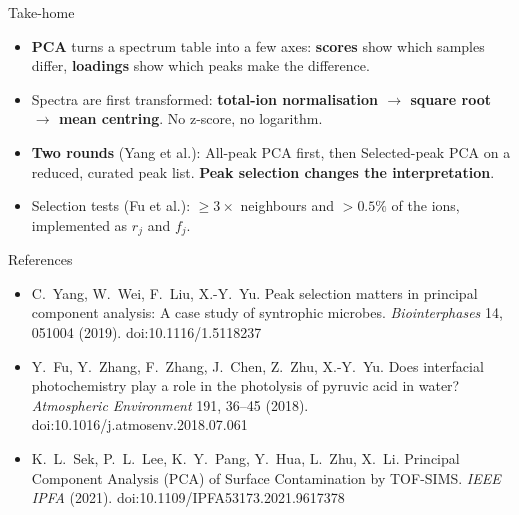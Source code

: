 \documentclass[aspectratio=169,10pt]{beamer}
\newcommand{\hl}[1]{{\color{warm}\bfseries #1}}
\begin{document}
\begin{frame}{Take-home}
  \begin{itemize}\setlength\itemsep{3mm}
    \item \hl{PCA} turns a spectrum table into a few axes: \hl{scores} show which samples differ, \hl{loadings} show which peaks make the difference.
    \item Spectra are first transformed: \hl{total-ion normalisation $\rightarrow$ square root $\rightarrow$ mean centring}. No z-score, no logarithm.
    \item \hl{Two rounds} (Yang et al.): All-peak PCA first, then Selected-peak PCA on a reduced, curated peak list. \hl{Peak selection changes the interpretation}.
    \item Selection tests (Fu et al.): $\ge3\times$ neighbours and $>0.5\%$ of the ions, implemented as $r_j$ and $f_j$.
  \end{itemize}
\end{frame}

\begin{frame}{References}
  \footnotesize
  \begin{itemize}\setlength\itemsep{3mm}
    \item C.~Yang, W.~Wei, F.~Liu, X.-Y.~Yu. Peak selection matters in principal component analysis: A case study of syntrophic microbes. \emph{Biointerphases} 14, 051004 (2019). doi:10.1116/1.5118237
    \item Y.~Fu, Y.~Zhang, F.~Zhang, J.~Chen, Z.~Zhu, X.-Y.~Yu. Does interfacial photochemistry play a role in the photolysis of pyruvic acid in water? \emph{Atmospheric Environment} 191, 36--45 (2018). doi:10.1016/j.atmosenv.2018.07.061
    \item K.~L.~Sek, P.~L.~Lee, K.~Y.~Pang, Y.~Hua, L.~Zhu, X.~Li. Principal Component Analysis (PCA) of Surface Contamination by TOF-SIMS. \emph{IEEE IPFA} (2021). doi:10.1109/IPFA53173.2021.9617378
  \end{itemize}
\end{frame}
\end{document}
